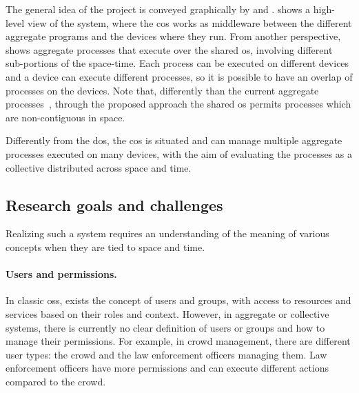 \documentclass[12pt, a4paper]{article}
\begin{document}
The general idea of the project is conveyed graphically by
 and .
%
 shows a high-level view of the system,
where the \ac{cos} works as middleware between the different aggregate programs and the devices where they run.
%
From another perspective,
 shows aggregate processes that execute over the shared \ac{os},
involving different sub-portions of the space-time.
%
Each process can be executed on different devices and a device can execute different processes,
so it is possible to have an overlap of processes on the devices.
%
Note that, differently than the current aggregate processes~\cite{EAAI2020-processes},
through the proposed approach the shared \ac{os} permits processes which are non-contiguous in space.

Differently from the \ac{dos},
the \ac{cos} is situated and can manage multiple aggregate processes executed on many devices,
with the aim of evaluating the processes as a collective distributed across space and time.

\subsection{Research goals and challenges}
\label{subsec:research-goals-and-challenges}

Realizing such a system requires an understanding of the meaning of various concepts when they are tied to space and time.

\paragraph{Users and permissions.}
\label{par:users-and-permissions}
In classic \acp{os},
exists the concept of users and groups,
with access to resources and services based on their roles and context.
%
However,
in aggregate or collective systems,
there is currently no clear definition of users or groups and how to manage their permissions.
%
For example,
in crowd management,
there are different user types:
the crowd and the law enforcement officers managing them.
%
Law enforcement officers have more permissions and can execute different actions compared to the crowd.
\end{document}
